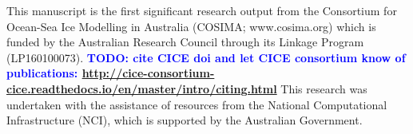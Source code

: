 \documentclass[gmd, manuscript]{copernicus}
\newcommand{\TODO}[1]{\textcolor{blue}{\textsf{\textbf{TODO: #1}}}}
\begin{document}



\begin{acknowledgements}
This manuscript is the first significant research output from the Consortium for Ocean-Sea Ice Modelling in Australia (COSIMA; www.cosima.org) which is funded by the Australian Research Council through its Linkage Program (LP160100073).
\TODO{cite CICE doi and let CICE consortium know of publications: \url{http://cice-consortium-cice.readthedocs.io/en/master/intro/citing.html}}
This research was undertaken with the assistance of resources from the National Computational Infrastructure (NCI), which is supported by the Australian Government.

\end{acknowledgements}









\end{document}
